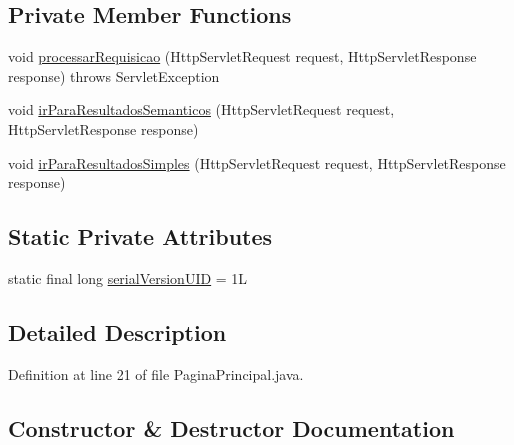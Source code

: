 \subsection*{Private Member Functions}
\begin{DoxyCompactItemize}
\item 
void \hyperlink{classcontrolador_1_1servlets_1_1PaginaPrincipal_a0a1fdddaf14f14c6454d400fb4cdc6f2}{processar\+Requisicao} (Http\+Servlet\+Request request, Http\+Servlet\+Response response)  throws Servlet\+Exception 
\item 
void \hyperlink{classcontrolador_1_1servlets_1_1PaginaPrincipal_a877a4f05faf8f1932e20cece0f7d39b7}{ir\+Para\+Resultados\+Semanticos} (Http\+Servlet\+Request request, Http\+Servlet\+Response response)
\item 
void \hyperlink{classcontrolador_1_1servlets_1_1PaginaPrincipal_a0aad40bb7b533fd6686c38b99b6aded8}{ir\+Para\+Resultados\+Simples} (Http\+Servlet\+Request request, Http\+Servlet\+Response response)
\end{DoxyCompactItemize}
\subsection*{Static Private Attributes}
\begin{DoxyCompactItemize}
\item 
static final long \hyperlink{classcontrolador_1_1servlets_1_1PaginaPrincipal_a49c31fd4aa9ba9711cd0e712eb5d805d}{serial\+Version\+U\+ID} = 1L
\end{DoxyCompactItemize}


\subsection{Detailed Description}


Definition at line 21 of file Pagina\+Principal.\+java.



\subsection{Constructor \& Destructor Documentation}
\hypertarget{classcontrolador_1_1servlets_1_1PaginaPrincipal_a81b4ce3852074660b6c49ad8f9381db2}{}\label{classcontrolador_1_1servlets_1_1PaginaPrincipal_a81b4ce3852074660b6c49ad8f9381db2} 
